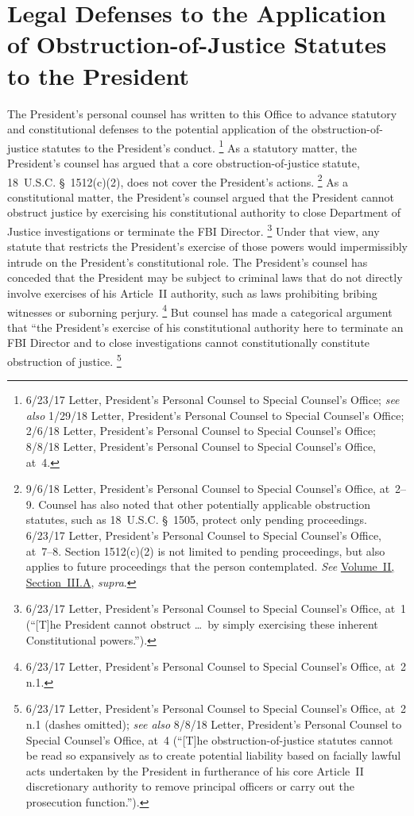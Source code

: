 \section{Legal Defenses to the Application of Obstruction-of-Justice Statutes to the President}

The President's personal counsel has written to this Office to advance statutory and constitutional defenses to the potential application of the obstruction-of-justice statutes to the President's conduct.%
\footnote{6/23/17 Letter, President's Personal Counsel to Special Counsel's Office;
\textit{see also} 1/29/18 Letter, President's Personal Counsel to Special Counsel's Office;
2/6/18 Letter, President's Personal Counsel to Special Counsel's Office;
8/8/18 Letter, President's Personal Counsel to Special Counsel's Office, at~4.}
As a statutory matter, the President's counsel has argued that a core obstruction-of-justice statute, 18~U.S.C. \S~1512(c)(2), does not cover the President's actions.%
\footnote{9/6/18 Letter, President's Personal Counsel to Special Counsel's Office, at~2--9.
Counsel has also noted that other potentially applicable obstruction statutes, such as 18~U.S.C. \S~1505, protect only pending proceedings.
6/23/17 Letter, President's Personal Counsel to Special Counsel's Office, at~7--8.
Section 1512(c)(2) is not limited to pending proceedings, but also applies to future proceedings that the person contemplated.
\textit{See} \hyperlink{subsection.2.3.1}{Volume~II, Section~III.A}, \textit{supra}.}
As a constitutional matter, the President's counsel argued that the President cannot obstruct justice by exercising his constitutional authority to close Department of Justice investigations or terminate the FBI Director.%
\footnote{6/23/17 Letter, President's Personal Counsel to Special Counsel's Office, at~1 (``[T]he President cannot obstruct \dots\ by simply exercising these inherent Constitutional powers.'').}
Under that view, any statute that restricts the President's exercise of those powers would impermissibly intrude on the President's constitutional role.
The President's counsel has conceded that the President may be subject to criminal laws that do not directly involve exercises of his Article~II authority, such as laws prohibiting bribing witnesses or suborning perjury.%
\footnote{6/23/17 Letter, President's Personal Counsel to Special Counsel's Office, at~2 n.1.}
But counsel has made a categorical argument that ``the President's exercise of his constitutional authority here to terminate an FBI Director and to close investigations cannot constitutionally constitute obstruction of justice.%
\footnote{6/23/17 Letter, President's Personal Counsel to Special Counsel's Office, at~2 n.1 (dashes omitted);
\textit{see also} 8/8/18 Letter, President's Personal Counsel to Special Counsel's Office, at~4 (``[T]he obstruction-of-justice statutes cannot be read so expansively as to create potential liability based on facially lawful acts undertaken by the President in furtherance of his core Article~II discretionary authority to remove principal officers or carry out the prosecution function.'').}

